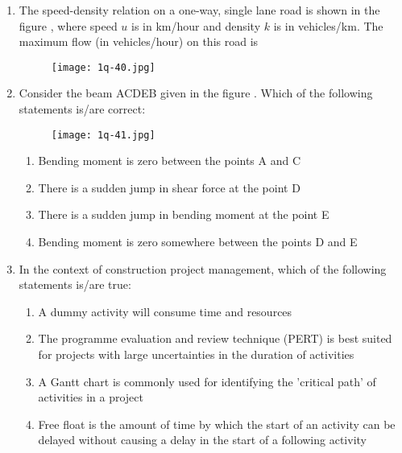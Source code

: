 \documentclass[journal,12pt,onecolumn]{article}
\theoremstyle{remark}
\begin{document}
\begin{enumerate}
\item The speed-density relation on a one-way, single lane road is shown in the figure , where speed $u$ is in km/hour and density $k$ is in vehicles/km. The maximum flow (in vehicles/hour) on this road is
\begin{figure}[H]
    \centering
    \texttt{[image: 1q-40.jpg]}
    \caption{}
    \label{fig:q40}
\end{figure}

\hfill{}
\begin{enumerate}
\end{enumerate}

\item Consider the beam ACDEB given in the figure . Which of the following statements is/are correct:
\begin{figure}[H]
    \centering
    \texttt{[image: 1q-41.jpg]}
    \caption{}
    \label{fig:q41}
\end{figure}

\hfill{}
\begin{enumerate}
    \item Bending moment is zero between the points A and C
    \item There is a sudden jump in shear force at the point D
    \item There is a sudden jump in bending moment at the point E
    \item Bending moment is zero somewhere between the points D and E
\end{enumerate}

\item In the context of construction project management, which of the following statements is/are true:

\hfill{}
\begin{enumerate}
    \item A dummy activity will consume time and resources
    \item The programme evaluation and review technique (PERT) is best suited for projects with large uncertainties in the duration of activities
    \item A Gantt chart is commonly used for identifying the 'critical path' of activities in a project
    \item Free float is the amount of time by which the start of an activity can be delayed without causing a delay in the start of a following activity
\end{enumerate}


\end{enumerate}
\end{document}
